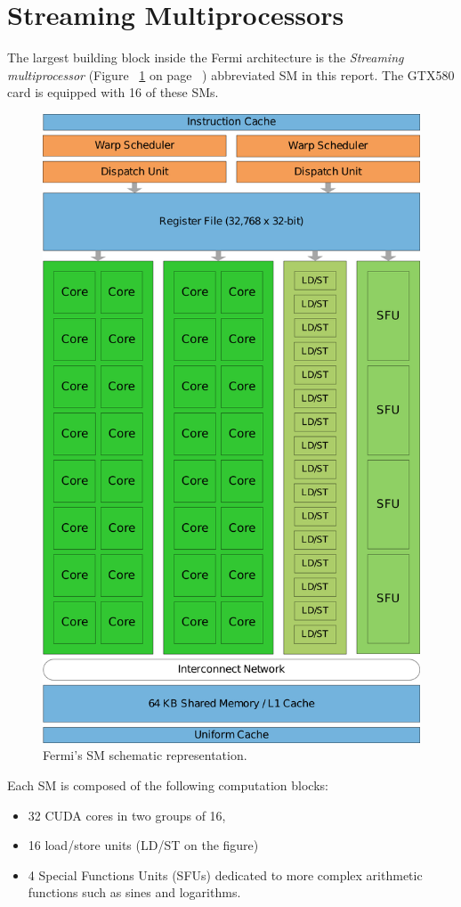 \documentclass{report}
\begin{document}
    \section{Streaming Multiprocessors}
    The largest building block inside the Fermi architecture is the 
    \emph{Streaming multiprocessor} (Figure ~\ref{fig:SM} on page 
    ~\pageref{fig:SM}) abbreviated SM in this report. The GTX580 card is equipped
    with 16 of these SMs.
    \begin{figure}[H]
    \centering
        \includegraphics[width=0.75\linewidth]{pictures/Fermi}
        \captionsetup{justification=centering}
        \caption{Fermi's SM schematic representation.\cite{fermiwhitepap}}
        \label{fig:SM}
    \end{figure}

    Each SM is composed of the following computation blocks\cite{fermiwhitepap}:
    \begin{itemize}
        \item 32 CUDA cores in two groups of 16,
        \item 16 load/store units (LD/ST on the figure)
        \item 4 Special Functions Units (SFUs) dedicated to more complex
              arithmetic functions such as sines and logarithms.
    \end{itemize}
    
\end{document}
